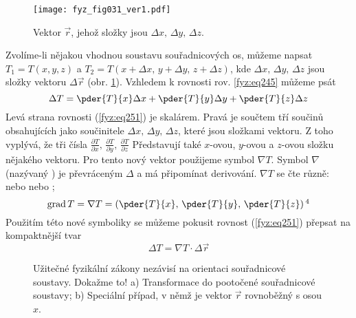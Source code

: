     \begin{figure}[ht!]  %
      \centering
      \texttt{[image: fyz\_fig031\_ver1.pdf]}
      \caption{Vektor $\vec{r}$, jehož složky jsou $\Delta x,\,\Delta y,\,\Delta z$.}
      \label{fyz:fig031}
    \end{figure}
    Zvolíme-li nějakou vhodnou soustavu souřadnicových os, můžeme napsat $T_1=T(x,y,z)$ a 
    $T_2=T(x+\Delta x,\,y+\Delta y,\,z+\Delta z)$, kde $\Delta x,\,\Delta y,\,\Delta z$ jsou složky 
    vektoru $\Delta \vec{r}$ (obr. \ref{fyz:fig031}). Vzhledem k rovnosti rov. 
    \ref{fyz:eq245} můžeme psát    
    \begin{equation}\label{fyz:eq251}
      \Delta T = \pder{T}{x}\Delta x + \pder{T}{y}\Delta y + \pder{T}{z}\Delta z
    \end{equation}
    Levá strana rovnosti (\ref{fyz:eq251}) je skalárem. Pravá je součtem tří součinů obsahujících 
    jako součinitele $\Delta x,\,\Delta y,\,\Delta z$, které jsou složkami vektoru. Z toho vyplývá, 
    že tři čísla \(\frac{\partial T}{\partial x},\,\frac{\partial T}{\partial y},\,\frac{\partial 
    T}{\partial z}\) Představují také \(x\)-ovou, \(y\)-ovou a \(z\)-ovou složku nějakého vektoru. 
    Pro tento nový vektor použijeme symbol \(\nabla T\). Symbol \(\nabla\) (nazývaný ) je 
    převráceným \(\Delta\) a má připomínat derivování. \(\nabla T\) se čte různě: \emph{} nebo \emph{} nebo \emph{};
    \begin{equation}\label{fyz:eq252}
      \mathrm{grad}\,T =\nabla T = \left(\pder{T}{x},\, \pder{T}{y},\,\pder{T}{z} \right)
      \protect\footnotemark[4]
    \end{equation}
    Použitím této nové symboliky se můžeme pokusit rovnost (\ref{fyz:eq251}) 
    přepsat na kompaktnější tvar
    \begin{equation}\label{fyz:eq257}
      \Delta T = \nabla T \cdot\Delta\vec{r}
    \end{equation}        

    \begin{figure}[ht!]
      \centering
      \caption{Užitečné fyzikální zákony nezávisí na orientaci souřadnicové soustavy. Dokažme to!
               a) Transformace do pootočené souřadnicové soustavy; b) Speciální případ, v němž je 
               vektor \(\vec{r}\) rovnoběžný s osou \(x\).
               \cite[s.~33]{Feynman02}}
      \label{fyz:fig154}
    \end{figure}

